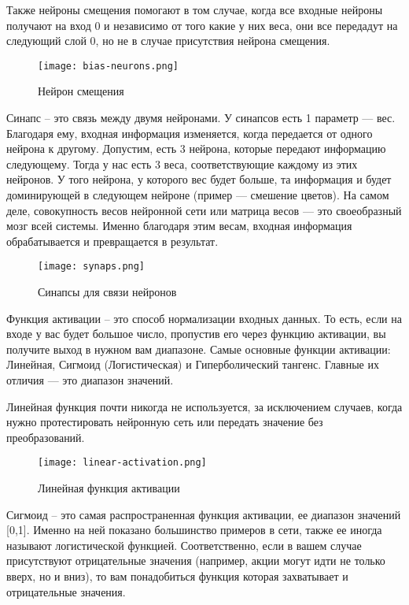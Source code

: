 Также нейроны смещения помогают в том случае, когда все входные нейроны получают на вход 0 и независимо от того какие
у них веса, они все передадут на следующий слой 0, но не в случае присутствия нейрона смещения.

\begin{figure}[!ht]
  \centering
  \texttt{[image: bias-neurons.png]}
  \caption{Нейрон смещения}
  \label{fig:analysis:bias-neurons}
\end{figure}

Синапс -- это связь между двумя нейронами. У синапсов есть 1 параметр — вес. Благодаря ему, входная информация изменяется,
когда передается от одного нейрона к другому. Допустим, есть 3 нейрона, которые передают информацию следующему.
Тогда у нас есть 3 веса, соответствующие каждому из этих нейронов. У того нейрона, у которого вес будет больше, та
информация и будет доминирующей в следующем нейроне (пример — смешение цветов). На самом деле, совокупность весов
нейронной сети или матрица весов — это своеобразный мозг всей системы. Именно благодаря этим весам, входная информация
обрабатывается и превращается в результат.

\begin{figure}[!ht]
  \centering
  \texttt{[image: synaps.png]}
  \caption{Синапсы для связи нейронов}
  \label{fig:analysis:synaps}
\end{figure}

Функция активации -- это способ нормализации входных данных. То есть, если на входе у
вас будет большое число, пропустив его через функцию активации, вы получите выход в нужном вам диапазоне. Самые
основные функции активации: Линейная, Сигмоид (Логистическая) и Гиперболический
тангенс. Главные их отличия — это диапазон значений.

Линейная функция почти никогда не используется, за исключением случаев, когда нужно протестировать нейронную сеть или
передать значение без преобразований.

\begin{figure}[!ht]
  \centering
  \texttt{[image: linear-activation.png]} 
  \caption{Линейная функция активации}
  \label{fig:analysis:linear-activation}
\end{figure}

Сигмоид -- это самая распространенная функция активации, ее диапазон значений [0,1]. Именно на ней показано большинство примеров
в сети, также ее иногда называют логистической функцией. Соответственно, если в вашем случае присутствуют отрицательные
значения (например, акции могут идти не только вверх, но и вниз), то вам понадобиться функция которая захватывает и
отрицательные значения.

